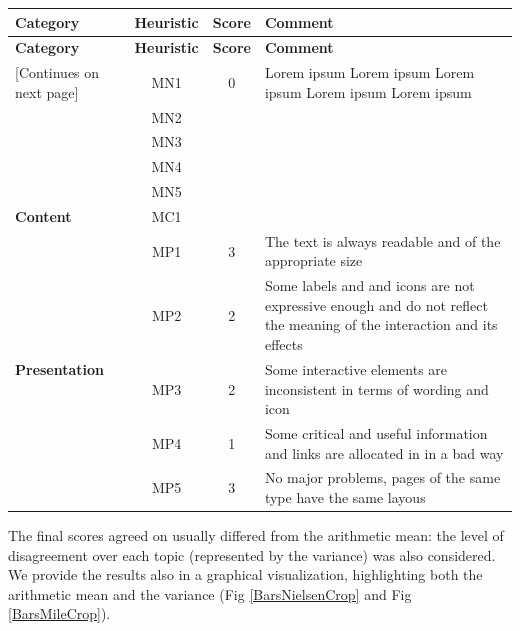 \begin{tabularx}{\linewidth}{l c c X}
\toprule
\textbf{Category} & \textbf{Heuristic} & \textbf{Score} & \textbf{Comment} \\
\midrule
\endfirsthead
\toprule
\textbf{Category} & \textbf{Heuristic} & \textbf{Score} & \textbf{Comment} \\
\midrule
\endhead
\midrule
\footnotesize [Continues on next page]
\endfoot
\bottomrule
\endlastfoot

\multirow{5}{*}{\textbf{Navigation}}   & MN1 & 0 & Lorem ipsum Lorem ipsum Lorem ipsum Lorem ipsum Lorem ipsum \\ \cmidrule{2-4} 
                                        & MN2 &  &  \\ \cmidrule{2-4} 
                                        & MN3 &  &  \\ \cmidrule{2-4} 
                                        & MN4 &  &  \\ \cmidrule{2-4} 
                                        & MN5 &  &  \\ \midrule
\textbf{Content}                       & MC1 &  &  \\ \midrule
\multirow{5}{*}{\textbf{Presentation}} & MP1 & 3 & The text is always readable and of the appropriate size \\ \cmidrule{2-4} 
                                        & MP2 & 2 & Some labels and and icons are not expressive enough and do not reflect the meaning of the interaction and its effects\\ \cmidrule{2-4} 
                                        & MP3 & 2 & Some interactive elements are inconsistent in terms of wording and icon\\ \cmidrule{2-4} 
                                        & MP4 & 1 & Some critical and useful information and links are allocated in in a bad way\\ \cmidrule{2-4} 
                                        & MP5 & 3 & No major problems, pages of the same type have the same layous
\end{tabularx}

\pagebreak

The final scores agreed on usually differed from the arithmetic mean: the level of disagreement over each topic (represented by the variance) was also considered.\\
We provide the results also in a graphical visualization, highlighting both the arithmetic mean and the variance (Fig \ref{BarsNielsenCrop} and Fig \ref{BarsMileCrop}).

